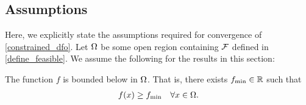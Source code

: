 



\subsection{Assumptions}

Here, we explicitly state the assumptions required for convergence of \cref{constrained_dfo}.
Let $\Omega$ be some open region containing ${\mathcal F}$ defined in \cref{define_feasible}.
We assume the following for the results in this section:



\begin{assumption}
\label{bounded_below_assumption}
The function $f$ is bounded below in $ \Omega $. That is, there exists $f_{\text{min}} \in \mathbb R$ such that
\begin{align*}
f(x) \ge f_{\text{min}} \quad  \forall x \in \Omega.
\end{align*}
\end{assumption}


